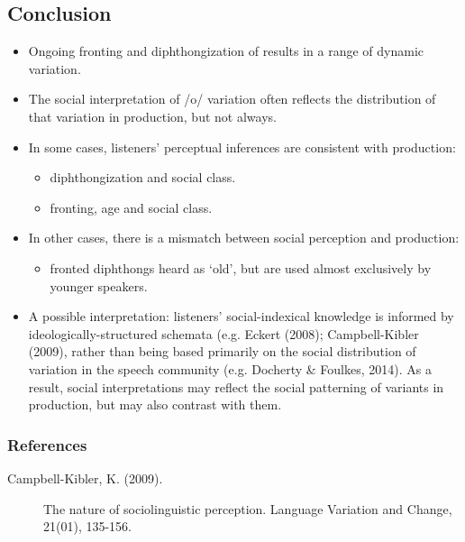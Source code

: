 \documentclass[a0,final]{a0poster}
\begin{document}
\begin{multicols*}{4}
\section*{Conclusion}
\begin{minipage}{.25\textwidth}
\vspace*{-.5cm}
\begin{itemize}
\item{Ongoing fronting and diphthongization of  results in a range of dynamic variation.}
\item{The social interpretation of /o/ variation often reflects the distribution of that variation in production, but not always.}
\item{In some cases, listeners' perceptual inferences are consistent with production:\begin{itemize}\item{diphthongization and social class.}\item{fronting, age and social class.}\end{itemize}}
\item{In other cases, there is a mismatch between social perception and production:\begin{itemize}\item{fronted diphthongs heard as `old', but are used almost exclusively by younger speakers.}\end{itemize}}
\item{A possible interpretation: listeners' social-indexical knowledge is informed by ideologically-structured schemata (e.g. Eckert (2008); Campbell-Kibler (2009), rather than being based primarily on the social distribution of variation in the speech community (e.g. Docherty \& Foulkes, 2014). As a result, social interpretations may reflect the social patterning of variants in production, but may also contrast with them.}



\end{itemize}
\end{minipage}
\vspace*{-1.5cm}
\subsubsection*{References}
\tiny
\begin{description}

\item[Campbell-Kibler, K. (2009).]{The nature of sociolinguistic perception. Language Variation and Change, 21(01), 135-156.}


\end{description}
\end{multicols*}
\end{document}
